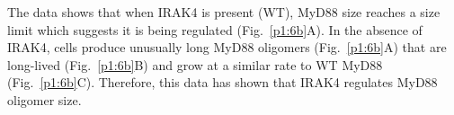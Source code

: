 The data shows that when IRAK4 is present (WT), MyD88 size reaches a size limit which suggests it is being regulated (Fig.~\ref{p1:6b}A). In the absence of IRAK4, cells produce unusually long MyD88 oligomers (Fig.~\ref{p1:6b}A) that are long-lived (Fig.~\ref{p1:6b}B) and grow at a similar rate to WT MyD88 (Fig.~\ref{p1:6b}C). Therefore, this data has shown that IRAK4 regulates MyD88 oligomer size. 


\begin{centering}

\end{centering}
